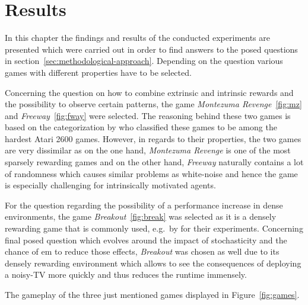 \documentclass[draft,final]{vutinfth} %
\begin{document}
    \glsresetall


    \chapter{Results}\label{ch:results}

    In this chapter the findings and results of the conducted experiments are presented which were carried out in order to find answers to the posed questions in section~\ref{sec:methodological-approach}.
    Depending on the question various games with different properties have to be selected.

    Concerning the question on how to combine extrinsic and intrinsic rewards and the possibility to observe certain patterns, the game \textit{Montezuma Revenge}~\eqref{fig:mz} and \textit{Freeway}~\eqref{fig:fway} were selected.
    The reasoning behind these two games is based on the categorization by \citeauthor{bellemare_unifying_2016} who classified these games to be among the hardest Atari 2600 games.
    However, in regards to their properties, the two games are very dissimilar as on the one hand, \textit{Montezuma Revenge} is one of the most sparsely rewarding games and on the other hand, \textit{Freeway} naturally contains a lot of randomness which causes similar problems as white-noise and hence the game is especially challenging for intrinsically motivated agents.

    For the question regarding the possibility of a performance increase in dense environments, the game \textit{Breakout}~\eqref{fig:break} was selected as it is a densely rewarding game that is commonly used, e.g.\ by \citet{burda_large-scale_2018-1} for their experiments.
    Concerning final posed question which evolves around the impact of stochasticity and the chance of \gls{em} to reduce those effects, \textit{Breakout} was chosen as well due to its densely rewarding environment which allows to see the consequences of deploying a noisy-TV more quickly and thus reduces the runtime immensely.

    The gameplay of the three just mentioned games displayed in Figure~\ref{fig:games}.
\end{document}
